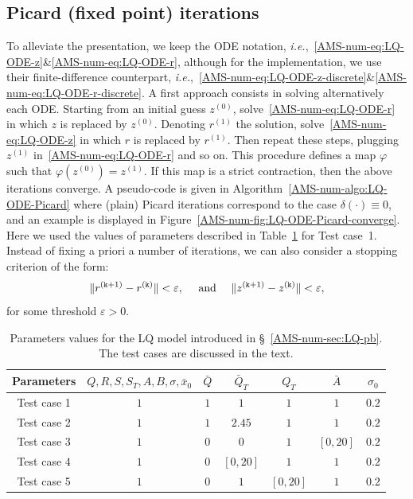 \documentclass{amsproc}
\theoremstyle{definition}
\theoremstyle{remark}
\numberwithin{equation}{section}
\begin{document}
\subsection{Picard (fixed point) iterations}

To alleviate the presentation, we keep the ODE notation, \textit{i.e.},~\eqref{AMS-num-eq:LQ-ODE-z}\&\eqref{AMS-num-eq:LQ-ODE-r}, although for the implementation, we use their finite-difference counterpart, \textit{i.e.},~\eqref{AMS-num-eq:LQ-ODE-z-discrete}\&\eqref{AMS-num-eq:LQ-ODE-r-discrete}. A first approach consists in solving alternatively each ODE. Starting from an initial guess $z^{(0)}$, solve~\eqref{AMS-num-eq:LQ-ODE-r} in which $z$ is replaced by $z^{(0)}$. Denoting $r^{(1)}$ the solution, solve~\eqref{AMS-num-eq:LQ-ODE-z} in which $r$ is replaced by $r^{(1)}$. Then repeat these steps, plugging $z^{(1)}$ in~\eqref{AMS-num-eq:LQ-ODE-r} and so on. This procedure defines a map $\varphi$ such that $\varphi(z^{(0)}) = z^{(1)}$. If this map is a strict contraction, then the above iterations converge. A pseudo-code is given in Algorithm~\ref{AMS-num-algo:LQ-ODE-Picard} where (plain) Picard iterations correspond to the case $\delta(\cdot) \equiv 0$, and an example is displayed in Figure~\ref{AMS-num-fig:LQ-ODE-Picard-converge}. Here we used the values of parameters described in Table~\ref{AMS-num-tab:params-LQ-base} for Test case~1. Instead of fixing a priori a number of iterations, we can also consider a stopping criterion of the form:
$$
	\|r^{(\mathtt{k}+1)} - r^{(\mathtt{k})}\| < \varepsilon, \quad \hbox{ and } \quad \|z^{(\mathtt{k}+1)} - z^{(\mathtt{k})}\| < \varepsilon,
$$
for some threshold $\varepsilon>0$.





{\renewcommand{\arraystretch}{1.2}
\begin{table}[!ht]
\begin{center}
	\begin{tabular}{c|c|c|c|c|c|c}
				\hline
			Parameters & $Q, R ,S ,S_T, A, B,\sigma, \bar x_0$ & $\bar Q$  & $\bar Q_T$   & $Q_T$ & $\bar A$ & $\sigma_0$	\\
			\hline
			 Test case 1 & $1$ & $1$ & $1$ & $1$ & $1$ & $0.2$ \\
			\hline
			 Test case 2 & $1$ & $1$ & $2.45$ & $1$ & $1$  & $0.2$ \\
			\hline
			 Test case 3 & $1$ & $0$ & $0$ & $1$ & $[0,20]$ & $0.2$ \\
			 \hline
			 Test case 4 & $1$ & $0$ & $[0,20]$ & $1$ & $1$ &  $0.2$ \\
			 \hline
			 Test case 5 & $1$ & $0$ & $1$ & $[0,20]$ & $1$ &  $0.2$ \\
				 \hline 
				\end{tabular}
\caption{Parameters values for the LQ model introduced in \S~\ref{AMS-num-sec:LQ-pb}. The test cases are discussed in the text.}
\label{AMS-num-tab:params-LQ-base}
	\end{center}
\end{table}
}
\end{document}
